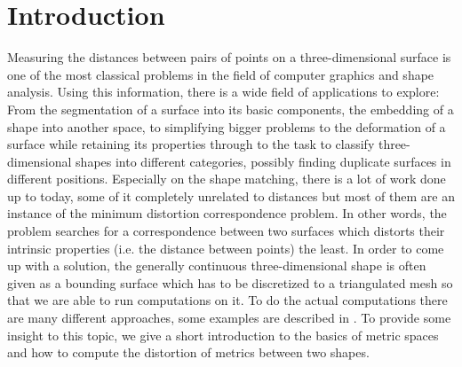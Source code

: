 \chapter{Introduction}
\label{chapter:introduction}

Measuring the distances between pairs of points on a three-dimensional surface is one of the most classical problems in the field of computer graphics and shape analysis.
Using this information, there is a wide field of applications to explore:
From the segmentation of a surface into its basic components, the embedding of a shape into another space, to simplifying bigger problems to the deformation of a surface while retaining its properties  through to the task to classify three-dimensional shapes into different categories, possibly finding duplicate surfaces in different positions.
Especially on the shape matching, there is a lot of work done up to today, some of it completely unrelated to distances but most of them are an instance of the minimum distortion correspondence problem.
In other words, the problem searches for a correspondence between two surfaces which distorts their intrinsic properties (i.e. the distance between points) the least.
In order to come up with a solution, the generally continuous three-dimensional shape is often given as a bounding surface which has to be discretized to a triangulated mesh so that we are able to run computations on it.
To do the actual computations there are many different approaches, some examples are described in \cite{rodola2012game,bronstein2006generalized,memoli2009spectral,rodola2013elastic}.
To provide some insight to this topic, we give a short introduction to the basics of metric spaces and how to compute the distortion of metrics between two shapes.

